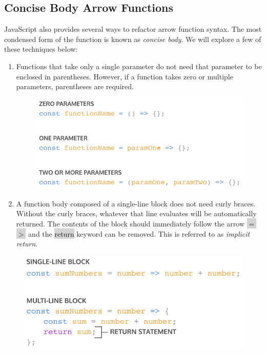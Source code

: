 \documentclass[11pt]{article}
\begin{document}
\subsection{Concise Body Arrow Functions}
JavaScript also provides several ways to refactor arrow function syntax. The most condensed form of the function is known as \textit{concise body}. We will explore a few of these techniques below:
\begin{enumerate}[leftmargin = *]
\item Functions that take only a single parameter do not need that parameter to be enclosed in parentheses. However, if a function takes zero or multiple parameters, parentheses are required.
\begin{figure}[H]
\includegraphics[scale = 0.73]{4_9}
\centering
\end{figure}
\item A function body composed of a single-line block does not need curly braces. Without the curly braces, whatever that line evaluates will be automatically returned. The contents of the block should immediately follow the arrow \colorbox{lightgray}{$=$$>$} and the \colorbox{lightgray}{return} keyword can be removed. This is referred to as \textit{implicit return}.
\end{enumerate}
\begin{figure}[H]
\includegraphics[scale = 0.73]{4_10}
\centering
\end{figure}
\end{document}
